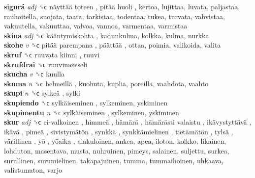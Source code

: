\textbf{sigurá} \emph{adj}  ␝ϲ   näyttää toteen ,  pitää huoli , kertoa, lujittaa, luvata, paljastaa, rauhoitella, suojata, taata, tarkistaa, todentaa, tukea, turvata, vahvistaa, vakuutella, vakuuttaa, valvoa, vannoa, varmentaa, varmistaa  \\
\textbf{skina} \emph{adj}  ␝ϲ   kääntymiskohta , kadunkulma, kolkka, kulma, nurkka  \\
\textbf{skohe} \emph{v}  ␝ϲ   pitää parempana ,  päättää , ottaa, poimia, valikoida, valita  \\
\textbf{skruf} ␝ϲ   ruuvata kiinni , ruuvi  \\
\textbf{skrufdrai} ␝ϲ  ruuvimeisseli  \\
\textbf{skucha} \emph{v}  ␝ϲ  kuulla  \\
\textbf{skuma} \emph{n}  ␝ϲ   helmeillä , kuohuta, kuplia, poreilla, vaahdota, vaahto  \\
\textbf{skupi} \emph{n}  ␝ϲ   sylkeä , sylki  \\
\textbf{skupiendo} ␝ϲ   sylkäiseminen , sylkeminen, yskiminen  \\
\textbf{skupimentu} \emph{n}  ␝ϲ   sylkäiseminen , sylkeminen, yskiminen  \\
\textbf{skur} \emph{adj}  ␝ϲ   ei-valkoinen ,  himmeä ,  hämärä ,  hämärästi valaistu ,  ikävystyttävä ,  ikävä ,  pimeä ,  sivistymätön ,  synkkä ,  synkkämielinen ,  tietämätön ,  tylsä ,  värillinen ,  yö ,  yöaika , alakuloinen, ankea, apea, iloton, kolkko, likainen, lohduton, masentava, musta, nuhruinen, pimeys, salainen, suljettu, surkea, surullinen, surumielinen, takapajuinen, tumma, tummaihoinen, uhkaava, valistumaton, varjo  \\
